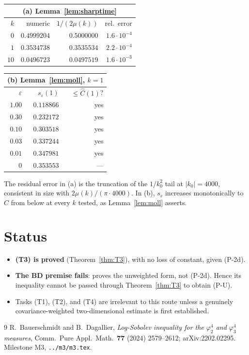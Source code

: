 \documentclass[11pt,a4paper]{article}
\theoremstyle{plain}
\theoremstyle{definition}
\begin{document}
\begin{center}
\begin{tabular}{rrrr}
\multicolumn{4}{c}{\textbf{(a) Lemma~\ref{lem:sharptime}}}\\
\toprule
$k$ & numeric & $1/(2\mu(k))$ & rel.\ error\\
\midrule
$0$   & $0.4999204$ & $0.5000000$ & $1.6\cdot10^{-4}$\\
$1$   & $0.3534738$ & $0.3535534$ & $2.2\cdot10^{-4}$\\
$10$  & $0.0496723$ & $0.0497519$ & $1.6\cdot10^{-3}$\\
\bottomrule
\end{tabular}
\qquad
\begin{tabular}{rrr}
\multicolumn{3}{c}{\textbf{(b) Lemma~\ref{lem:moll}}, $k=1$}\\
\toprule
$\varepsilon$ & $s_\varepsilon(1)$ & $\le\widehat C(1)$?\\
\midrule
$1.00$ & $0.118866$ & yes\\
$0.30$ & $0.232172$ & yes\\
$0.10$ & $0.303518$ & yes\\
$0.03$ & $0.337244$ & yes\\
$0.01$ & $0.347981$ & yes\\
\midrule
$0$ & $0.353553$ & ---\\
\bottomrule
\end{tabular}
\end{center}

The residual error in (a) is the truncation of the $1/k_0^2$ tail at $|k_0|=4000$, consistent in
size with $2\mu(k)/(\pi\cdot4000)$. In (b), $s_\varepsilon$ increases monotonically to
$\widehat C$ from below at every $k$ tested, as Lemma~\ref{lem:moll} asserts.

\section{Status}

\begin{itemize}
\item \textbf{(T3) is proved} (Theorem~\ref{thm:T3}), with no loss of constant, given (P-2d).
\item \textbf{The BD premise fails}: \cite{BD} proves the unweighted form, not (P-2d).  Hence its
      inequality cannot be passed through Theorem~\ref{thm:T3} to obtain (P-U).
\item Tasks (T1), (T2), and (T4) are irrelevant to this route unless a genuinely
      covariance-weighted two-dimensional estimate is first established.
\end{itemize}

\begin{thebibliography}{9}
 R.~Bauerschmidt and B.~Dagallier, \emph{Log-Sobolev inequality for the $\varphi^4_2$
and $\varphi^4_3$ measures}, Comm.\ Pure Appl.\ Math.\ \textbf{77} (2024) 2579--2612;
arXiv:2202.02295.
 Milestone M3, \texttt{../m3/m3.tex}.
\end{thebibliography}
\end{document}
